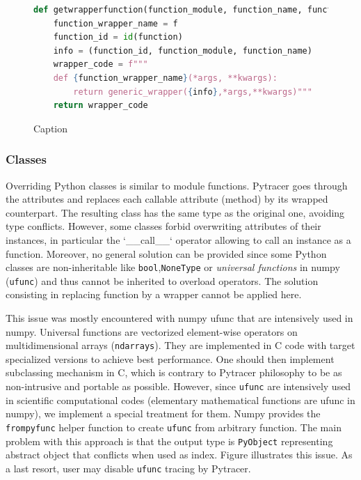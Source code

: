 \documentclass[11pt]{article}
\begin{document}
\begin{figure}
    \centering
\begin{lstlisting}[language=Python,style=customPython]
def getwrapperfunction(function_module, function_name, function, function_wrapper_name):
    function_wrapper_name = f
    function_id = id(function)
    info = (function_id, function_module, function_name)
    wrapper_code = f"""
    def {function_wrapper_name}(*args, **kwargs):
        return generic_wrapper({info},*args,**kwargs)"""
    return wrapper_code
\end{lstlisting}
    \caption{Caption}
    \label{fig:wrapper_code}
\end{figure}

\subsubsection{Classes}

Overriding Python classes is similar to module functions.
Pytracer goes through the attributes and replaces each callable attribute (method) by its wrapped counterpart.
The resulting class has the same type as the original one, avoiding type conflicts.
However, some classes forbid overwriting attributes of their instances, in particular the `\_\_call\_\_` operator
allowing to call an instance as a function.
Moreover, no general solution can be provided since some Python classes are non-inheritable 
like \texttt{bool},\texttt{NoneType} or \textit{universal functions} in numpy (\texttt{ufunc})
and thus cannot be inherited to overload operators.
The solution consisting in replacing function by a wrapper cannot be applied here.

This issue was mostly encountered with numpy ufunc that are intensively used in numpy. Universal functions are vectorized element-wise operators on
multidimensional arrays (\texttt{ndarrays}). They are implemented in C code with target specialized versions to achieve best performance.
One should then implement subclassing mechanism in C, which is contrary to Pytracer philosophy to be as non-intrusive and portable as possible.
However, since \texttt{ufunc} are intensively used in scientific computational codes (elementary mathematical functions are ufunc in numpy),
we implement a special treatment for them. Numpy provides the \texttt{frompyfunc} helper function to create \texttt{ufunc} from arbitrary function.
The main problem with this approach is that the output type is \texttt{PyObject} representing abstract object that conflicts 
when used as index. Figure illustrates this issue. As a last resort, user may disable \texttt{ufunc} tracing by Pytracer.
\end{document}
